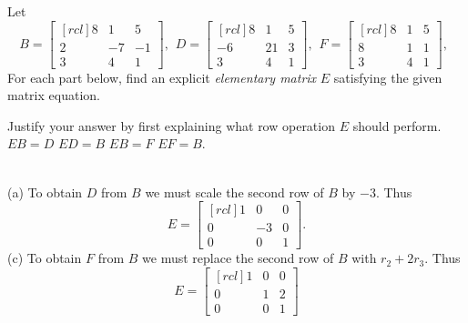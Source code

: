 \bb
\ii Let \[
B =
\begin{bmatrix}[rcl]
8&1&5\\
2&-7&-1\\
3&4&1
\end{bmatrix}, \hspace{5pt}
D =
\begin{bmatrix}[rcl]
8&1&5\\
-6&21&3\\
3&4&1
\end{bmatrix}, \hspace{5pt}
F =
\begin{bmatrix}[rcl]
8&1&5\\
8&1&1\\
3&4&1
\end{bmatrix}, \hspace{5pt}
\]
For each part below, find an explicit {\em elementary matrix} $E$ satisfying the given matrix equation. 

Justify your answer by first explaining what row operation $E$ should perform. 
\bb
\ii $EB = D$
\ii $ED=B$
\ii $EB=F$
\ii $EF=B$. 
\ee
\begin{solution}
\ \\
(a) To obtain $D$ from $B$ we must scale the second row of $B$ by $-3$. Thus 
\[ E = 
\begin{bmatrix}[rcl]
1&0&0\\
0&-3&0\\
0&0&1
\end{bmatrix}.
\]
\noindent (c) To obtain $F$ from $B$ we must replace the second row of $B$ with $r_2+2r_3$. Thus 
\[
E =
\begin{bmatrix}[rcl]
1&0&0\\
0&1&2\\
0&0&1
\end{bmatrix}
\]
\end{solution}

